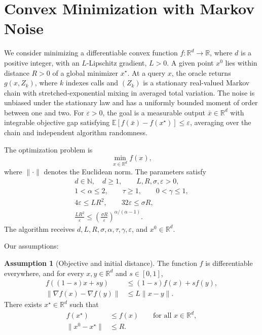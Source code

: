 \documentclass[10pt]{article}
\theoremstyle{definition}
\newtheorem{assumption}{Assumption}
\begin{document}
\section*{Convex Minimization with Markov Noise}
We consider minimizing a differentiable convex function $f:\mathbb{R}^d\to\mathbb{R}$, where $d$ is a positive integer, with an $L$-Lipschitz gradient, $L>0$. A given point $x^0$ lies within distance $R>0$ of a global minimizer $x^\star$. At a query $x$, the oracle returns $g(x,Z_k)$, where $k$ indexes calls and $(Z_k)$ is a stationary real-valued Markov chain with stretched-exponential mixing in averaged total variation. The noise is unbiased under the stationary law and has a uniformly bounded moment of order between one and two. For $\varepsilon>0$, the goal is a measurable output $\bar{x}\in\mathbb{R}^d$ with integrable objective gap satisfying $\mathbb{E}[f(\bar{x})-f(x^\star)]\leq\varepsilon$, averaging over the chain and independent algorithm randomness.

The optimization problem is
\[
\min_{x\in\mathbb{R}^d} f(x),
\]
where $\|\cdot\|$ denotes the Euclidean norm. The parameters satisfy
\[
\begin{gathered}
d\in\mathbb{N},\quad d\geq 1,\qquad L,R,\sigma,\varepsilon>0,\\
1<\alpha\leq 2,\qquad \tau\geq 1,\qquad 0<\gamma\leq 1,\\
4\varepsilon\leq LR^2,\qquad 32\varepsilon\leq\sigma R,\\
\frac{LR^2}{\varepsilon}
\leq\left(\frac{\sigma R}{\varepsilon}\right)^{\alpha/(\alpha-1)}.
\end{gathered}
\]
The algorithm receives $d,L,R,\sigma,\alpha,\tau,\gamma,\varepsilon$, and $x^0\in\mathbb{R}^d$.

Our assumptions:
\begin{assumption}[Objective and initial distance]
The function $f$ is differentiable everywhere, and for every $x,y\in\mathbb{R}^d$ and $s\in[0,1]$,
\[
\begin{aligned}
f((1-s)x+sy)&\leq (1-s)f(x)+sf(y),\\
\|\nabla f(x)-\nabla f(y)\|&\leq L\|x-y\|.
\end{aligned}
\]
There exists $x^\star\in\mathbb{R}^d$ such that
\[
\begin{aligned}
f(x^\star)&\leq f(x)\qquad\text{for all }x\in\mathbb{R}^d,\\
\|x^0-x^\star\|&\leq R.
\end{aligned}
\]
\end{assumption}
\end{document}
